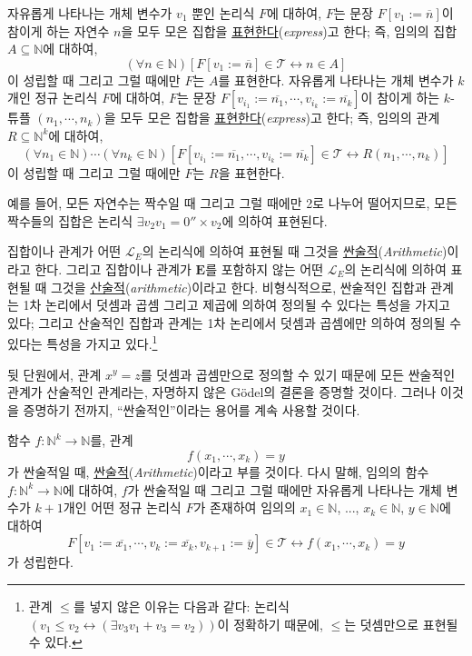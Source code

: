 \documentclass[12pt]{paper}
\begin{document}
자유롭게 나타나는 개체 변수가 $v_{1}$ 뿐인 논리식 $F$에 대하여,
$F$는 문장 $F \left[ v_{1} := \overline{n} \right]$이 참이게 하는 자연수 $n$을 모두 모은 집합을 \underline{표현한다}(\textit{express})고 한다;
즉, 임의의 집합 $A \subseteq \mathbb{N}$에 대하여, $$ \left( \forall n \in \mathbb{N} \right) \left[ F \left[ v_{1} := \overline{n} \right] \in \mathcal{T} \leftrightarrow n \in A \right] $$이 성립할 때 그리고 그럴 때에만 $F$는 $A$를 표현한다.
자유롭게 나타나는 개체 변수가 $k$개인 정규 논리식 $F$에 대하여,
$F$는 문장 $F \left[ v_{i_{1}} := \overline{n_{1}} , \cdots , v_{i_{k}} := \overline{n_{k}} \right]$이 참이게 하는 $k$-튜플 $\left( n_{1} , \cdots , n_{k} \right)$을 모두 모은 집합을 \underline{표현한다}(\textit{express})고 한다;
즉, 임의의 관계 $R \subseteq \mathbb{N}^{k}$에 대하여, $$ \left( \forall n_{1} \in \mathbb{N} \right) \cdots \left( \forall n_{k} \in \mathbb{N} \right) \left[ F \left[ v_{i_{1}} := \overline{n_{1}} , \cdots , v_{i_{k}} := \overline{n_{k}} \right] \in \mathcal{T} \leftrightarrow R \left( n_{1} , \cdots , n_{k} \right) \right] $$이 성립할 때 그리고 그럴 때에만 $F$는 $R$을 표현한다.

예를 들어, 모든 자연수는 짝수일 때 그리고 그럴 때에만 2로 나누어 떨어지므로, 모든 짝수들의 집합은 논리식 $\exists v_{2} v_{1} = 0'' \times v_{2}$에 의하여 표현된다.

집합이나 관계가 어떤 $\mathcal{L}_{E}$의 논리식에 의하여 표현될 때 그것을 \underline{싼술적}(\textit{Arithmetic})이라고 한다.
그리고 집합이나 관계가 $\mathbf{E}$를 포함하지 않는 어떤 $\mathcal{L}_{E}$의 논리식에 의하여 표현될 때 그것을 \underline{산술적}(\textit{arithmetic})이라고 한다.
비형식적으로, 싼술적인 집합과 관계는 1차 논리에서 덧셈과 곱셈 그리고 제곱에 의하여 정의될 수 있다는 특성을 가지고 있다;
그리고 산술적인 집합과 관계는 1차 논리에서 덧셈과 곱셈에만 의하여 정의될 수 있다는 특성을 가지고 있다.\footnote
{
관계 $\leq$를 넣지 않은 이유는 다음과 같다:
논리식 $\left( v_{1} \leq v_{2} \leftrightarrow \left( \exists v_{3} v_{1} + v_{3} = v_{2} \right) \right)$이 정확하기 때문에,
$\leq$는 덧셈만으로 표현될 수 있다.
}

뒷 단원에서, 관계 $x^{y} = z$를 덧셈과 곱셈만으로 정의할 수 있기 때문에 모든 싼술적인 관계가 산술적인 관계라는,
자명하지 않은 G\"odel의 결론을 증명할 것이다.
그러나 이것을 증명하기 전까지, ``싼술적인''이라는 용어를 계속 사용할 것이다.

함수 $f : \mathbb{N}^{k} \to \mathbb{N}$를, 관계 $$f \left( x_{1} , \cdots , x_{k} \right) = y$$가 싼술적일 때, \underline{싼술적}(\textit{Arithmetic})이라고 부를 것이다.
다시 말해, 임의의 함수 $f : \mathbb{N}^{k} \to \mathbb{N}$에 대하여, $f$가 싼술적일 때 그리고 그럴 때에만 자유롭게 나타나는 개체 변수가 $k + 1$개인 어떤 정규 논리식 $F$가 존재하여
임의의 $x_{1} \in \mathbb{N}$, ..., $x_{k} \in \mathbb{N}$, $y \in \mathbb{N}$에 대하여 $$ F \left[ v_{1} := \overline{x_1} , \cdots , v_{k} := \overline{x_k} , v_{k + 1} := \overline{y} \right] \in \mathcal{T} \leftrightarrow f \left( x_{1} , \cdots , x_{k} \right) = y $$가 성립한다.
\end{document}
